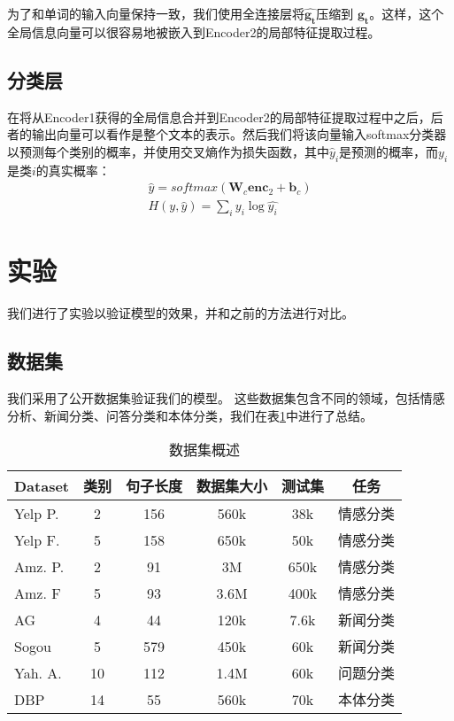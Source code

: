 为了和单词的输入向量保持一致，我们使用全连接层将$\hat{\mathbf{g_t}}$压缩到 $\mathbf{g_t}$。这样，这个全局信息向量可以很容易地被嵌入到Encoder2的局部特征提取过程。

\subsection{分类层}
在将从Encoder1获得的全局信息合并到Encoder2的局部特征提取过程中之后，后者的输出向量可以看作是整个文本的表示。然后我们将该向量输入softmax分类器以预测每个类别的概率，并使用交叉熵作为损失函数，其中$\hat{y}_{i}$是预测的概率，而$y_i$是类$i$的真实概率：
\begin{gather}
\hat{y} = softmax(\mathbf{W}_{c}\mathbf{enc}_2  + \mathbf{b}_c)\\
{H(y,\hat{y})} = \sum_{i}{y}_{i}\log\hat{{y}_{i}}
\end{gather}


\section{实验}
我们进行了实验以验证模型的效果，并和之前的方法进行对比。

\subsection{数据集}

我们采用了公开数据集验证我们的模型\cite{zhang2015character}。
这些数据集包含不同的领域，包括情感分析、新闻分类、问答分类和本体分类，我们在表\ref{tab:datasets}中进行了总结。

\begin{table}[t]
  \begin{center}
    \begin{tabular}{lccccc}
    \toprule
      Dataset & 类别 & 句子长度 & 数据集大小 & 测试集 & 任务 \\
      \midrule
      Yelp P. & 2 & 156 & 560k & 38k & 情感分类 \\
      Yelp F. & 5 & 158 & 650k & 50k & 情感分类  \\
      Amz. P. & 2 & 91 & 3M & 650k & 情感分类 \\
      Amz. F & 5 & 93 & 3.6M & 400k & 情感分类 \\
      AG & 4 & 44 & 120k & 7.6k & 新闻分类\\
      Sogou & 5 & 579 & 450k & 60k & 新闻分类\\
      Yah. A. & 10 & 112 & 1.4M & 60k & 问题分类\\
      DBP & 14 & 55 & 560k & 70k & 本体分类\\
    \bottomrule
    \end{tabular}
  \end{center}
\caption{数据集概述}
\label{tab:datasets}
\end{table}

